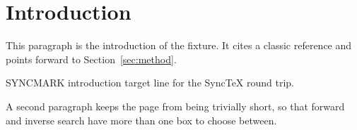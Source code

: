 \section{Introduction}\label{sec:intro}

This paragraph is the introduction of the fixture. It cites a classic
reference \cite{knuth1984} and points forward to Section~\ref{sec:method}.

SYNCMARK introduction target line for the SyncTeX round trip.

A second paragraph keeps the page from being trivially short, so that
forward and inverse search have more than one box to choose between.
